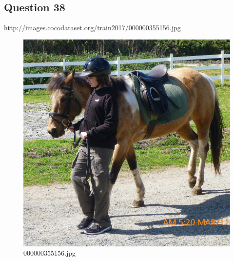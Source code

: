 \subsection*{Question 38}
\url{http://images.cocodataset.org/train2017/000000355156.jpg}
    \begin{figure}[h]
        \centering
        \includegraphics[width=0.8\linewidth]{../image set/easy/000000355156.jpg}
        \caption{000000355156.jpg}
    \end{figure}
